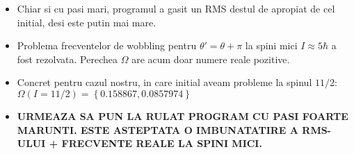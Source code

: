 \documentclass[11pt]{article}
\begin{document}
\begin{itemize}
    \item Chiar si cu pasi mari, programul a gasit un RMS destul de apropiat de cel initial, desi este putin mai mare.
    \item Problema frecventelor de wobbling pentru $\theta'=\theta+\pi$ la spini mici $I\approx 5\hbar$ a fost rezolvata. Perechea $\Omega$ are acum doar numere reale pozitive.
    \item Concret pentru cazul nostru, in care initial aveam probleme la spinul $11/2$: $\Omega(I=11/2)=\left\{0.158867,0.0857974\right\}$
    \item \textbf{URMEAZA SA PUN LA RULAT PROGRAM CU PASI FOARTE MARUNTI. ESTE ASTEPTATA O IMBUNATATIRE A RMS-ULUI + FRECVENTE REALE LA SPINI MICI.}
\end{itemize}
\end{document}
